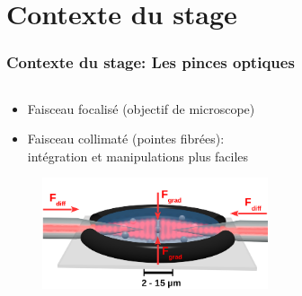 \documentclass[9pt,a9paper,handout]{beamer}
\begin{document}
\section{Contexte du stage}
    \begin{frame}
        \frametitle{Contexte du stage: Les pinces optiques}
        
        \begin{columns}[T]
        \begin{column}{0.70\textwidth}
        \begin{itemize}
            \vspace*{8mm}
            \item Faisceau focalisé (objectif de microscope)
            \vspace*{10mm}
            \item Faisceau collimaté (pointes fibrées): \\intégration et manipulations plus faciles
        \end{itemize}
        \vspace*{-5mm}
        \begin{figure}[H]
            \includegraphics[width=0.7\textwidth]{Images/Schemas/piegeage_deuxpointes}
        \end{figure}
        \end{column}
        \begin{column}{0.3\textwidth}
            \begin{figure}[H]

\end{figure}
\end{column}
\end{columns}
\end{frame}
\end{document}
